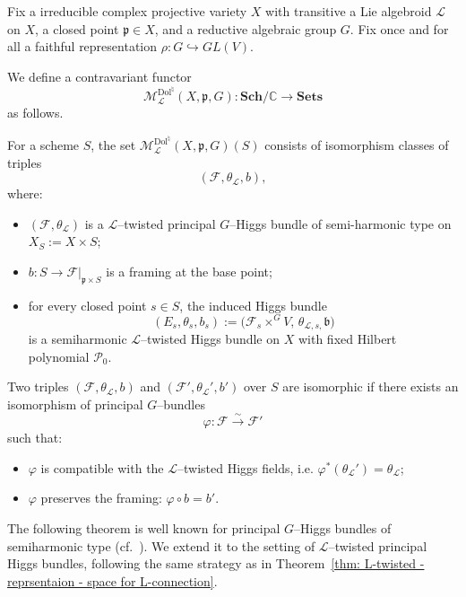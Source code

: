 \documentclass[12pt,reqno]{amsart}
\numberwithin{equation}{subsection}
\theoremstyle{definition}
\theoremstyle{theorem}
\begin{document}
Fix a irreducible complex projective variety $X$ with transitive a Lie algebroid $\mathcal{L}$ on $X$, a closed point $\mathfrak{p} \in X$, and a
reductive algebraic group $G$.
Fix once and for all a faithful representation
$\rho \colon G \hookrightarrow GL(V)$.

We define a contravariant functor
\[
\mathcal{M}^{\mathrm{Dol}^{\natural}}_{\mathcal{L}}(X,\mathfrak{p},G)
\colon \mathbf{Sch}/\mathbb{C} \longrightarrow \mathbf{Sets}
\]
as follows.


For a scheme $S$, the set
$\mathcal{M}^{\mathrm{Dol}^{\natural}}_{\mathcal{L}}(X,\mathfrak{p},G)(S)$
consists of isomorphism classes of triples
\[
(\mathcal{F},\theta_{\mathcal{L}}, b),
\]
where:
\begin{itemize}
	\item
	$(\mathcal{F}, \theta_{\mathcal{L}})$ is a $\mathcal{L}$--twisted principal $G$--Higgs bundle of semi-harmonic type on $X_S := X \times S$;
	\item
	$b \colon S \to \mathcal{F}|_{\mathfrak{p}\times S}$ is a framing at the base point;
	
	\item
	for every closed point $s \in S$, the induced Higgs bundle
	\[
	(E_s,\theta_s,b_{s})
	:=
	\bigl(
	\mathcal{F}_s \times^{G} V,\,
	\theta_{\mathcal{L},s,}\mathfrak{b}
	\bigr)
	\]
	is a semiharmonic $\mathcal{L}$--twisted Higgs bundle on $X$ with fixed Hilbert polynomial $\mathcal{P}_{0}$.
\end{itemize}
Two triples $(\mathcal{F},\theta_{\mathcal{L}},b)$ and
$(\mathcal{F}',\theta_{\mathcal{L}}',b')$ over $S$ are isomorphic if there
exists an isomorphism of principal $G$--bundles
\[
\varphi \colon \mathcal{F} \xrightarrow{\sim} \mathcal{F}'
\]
such that:
\begin{itemize}
	\item
	$\varphi$ is compatible with the $\mathcal{L}$--twisted Higgs fields,
	i.e. $\varphi^*(\theta_{\mathcal{L}}') = \theta_{\mathcal{L}}$;
	
	\item
	$\varphi$ preserves the framing:
	$\varphi \circ b = b'$.
\end{itemize}

The following theorem is well known for principal $G$--Higgs bundles of
semiharmonic type (cf.~\cite[\S\,9, Th.~9.6]{CT.Simpson-1995}). We extend it
to the setting of $\mathcal{L}$--twisted principal Higgs bundles, following the same strategy as in
Theorem~\eqref{thm: L-twisted - reprsentaion - space for L-connection}.
\end{document}
